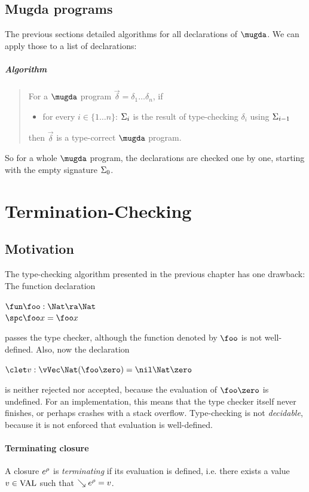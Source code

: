 
\section{Mugda programs}
\label{tca}
The previous sections detailed algorithms for all declarations of $\mugda$. 
We can apply those to a list of declarations:
\paragraph*{Algorithm}
\begin{quote}
For a $\mugda$ program $ \vec{\delta} = \delta_1 \ldots \delta_n$, if
\begin{itemize}
\item
for every $i \in \{ 1 \ldots n \}$: $\Sigma_i$ is the result of type-checking $\delta_i$ using $\Sigma_{i-1}$
\end{itemize}
then $\vec{\delta}$ is a type-correct $\mugda$ program.
\end{quote}
So for a whole $\mugda$ program, the declarations are checked one by one, starting with the empty signature $\Sigma_0$.

\chapter{Termination-Checking}

\section{Motivation}
The type-checking algorithm presented in the previous chapter has one drawback:
The function declaration
\begin{bsp}
$\fun \foo : \Nat \ra \Nat$\\
$\spc \foo x = \foo x$
\end{bsp}
passes the type checker, although the function denoted by $\foo$ is not well-defined.
Also, now the declaration
\begin{bsp}
$\clet v : \vVec \Nat (\foo \zero) = \nil \Nat \zero$
\end{bsp}
is neither rejected nor accepted, because the evaluation of $\foo \zero$ is undefined.
For an implementation, this means that the type checker itself never finishes, or perhaps crashes with a stack overflow.
Type-checking is not \emph{decidable}, because it is not enforced that evaluation is well-defined.


\subsubsection{Terminating closure}
A closure $e^{\rho}$ is \emph{terminating} if its evaluation is defined, i.e. there exists a value $v \in \operatorname{VAL}$ such that $\searrow e^{\rho}= v$. 

